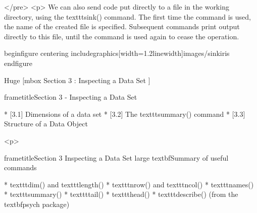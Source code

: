  		</pre>
<p> 
 		We can also send code put directly to a file in the working directory, using the texttt{sink()}
 		command. The first time the command is used, the name of the created file is specified.
 		Subsequent commands print output directly to this file, until the command is used again to
 		cease the operation.
 	
 	
 		begin{figure}
 			centering
 			includegraphics[width=1.2linewidth]{images/sinkiris}
 		end{figure}
 		
 	

 	
 	
 		Huge
 		[mbox{ Section 3 : Inspecting a Data Set } ]
 	
 	
 		frametitle{Section 3 - Inspecting a Data Set }
 		
 			        * [3.1] Dimensions of a data set 
 			        * [3.2] The texttt{summary()} command   
 			        * [3.3] Structure of a Data Object 
 		
 	
<p>
 	
 	
 		frametitle{Section 3 Inspecting a Data Set}
 		large 
 		textbf{Summary of useful commands}
 		
 			         * texttt{dim()} and texttt{length()}
 			         * texttt{nrow()} and texttt{ncol()}
 			         * texttt{names()}
 			         * texttt{summary()}
 			         * texttt{tail()}
 			         * texttt{head()}
 			         * texttt{describe()} (from the textbf{psych} package)
 		
